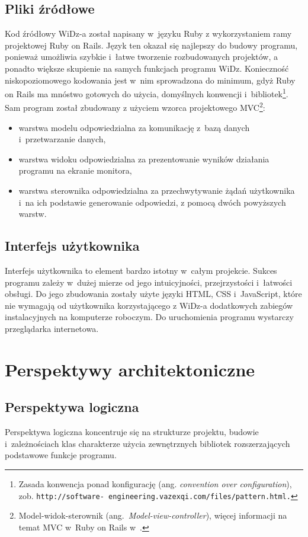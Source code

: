 \documentclass[12pt,leqno,twoside]{mwart}
\begin{document}
\subsection{Pliki źródłowe}
\noindent Kod źródłowy WiDz-a został napisany w~języku Ruby z wykorzystaniem ramy projektowej Ruby on Rails. Język ten okazał się najlepszy do budowy programu, ponieważ umożliwia szybkie i~łatwe tworzenie rozbudowanych projektów, a ponadto większe skupienie na samych funkcjach programu WiDz. Konieczność niskopoziomowego kodowania jest w~nim sprowadzona do minimum, gdyż Ruby on Rails ma mnóstwo gotowych do użycia, domyślnych konwencji i~bibliotek\footnote{Zasada konwencja ponad konfigurację (ang. \textit{convention over configuration}), zob. \tt{http://software}\rm{-} \tt{engineering.vazexqi.com/files/pattern.html}.}. Sam program został zbudowany z użyciem wzorca projektowego MVC\footnote{Model-widok-sterownik (ang.~\textit{Model-view-controller}), więcej informacji na temat MVC w~Ruby on Rails w~\cite{SP}.}:
\begin{itemize}
\item warstwa modelu odpowiedzialna za komunikację z~bazą danych i~przetwarzanie danych,
\item warstwa widoku odpowiedzialna za prezentowanie wyników działania programu na ekranie monitora,
\item warstwa sterownika odpowiedzialna za przechwytywanie żądań użytkownika i~na ich podstawie generowanie odpowiedzi, z pomocą dwóch powyższych warstw.
\end{itemize}

\subsection{Interfejs użytkownika}
\noindent Interfejs użytkownika to element bardzo istotny w~całym projekcie. Sukces programu zależy w~dużej mierze od jego intuicyjności, przejrzystości i~łatwości obsługi. Do jego zbudowania zostały użyte języki HTML, CSS i~JavaScript, które nie wymagają od użytkownika korzystającego z WiDz-a dodatkowych zabiegów instalacyjnych na komputerze roboczym. Do uruchomienia programu wystarczy przeglądarka internetowa.

\section{Perspektywy architektoniczne}
\subsection{Perspektywa logiczna}
\noindent Perspektywa logiczna koncentruje się na strukturze projektu, budowie i~zależnościach klas charakterze użycia zewnętrznych bibliotek rozszerzających podstawowe funkcje programu.%
\end{document}
